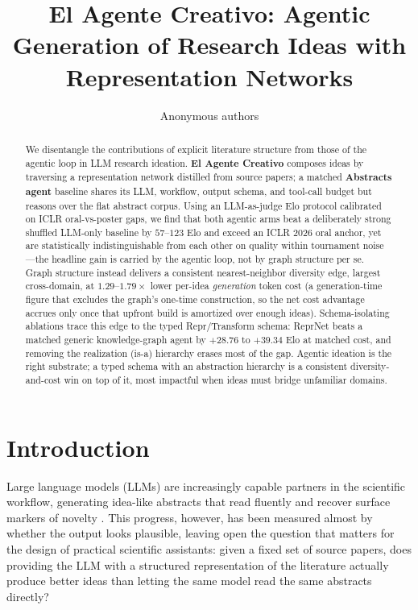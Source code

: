 \documentclass[10pt,twocolumn]{article}
\title{El Agente Creativo: Agentic Generation of Research Ideas with Representation Networks}
\author{Anonymous authors}
\begin{document}
\maketitle

\begin{abstract}
We disentangle the contributions of explicit literature structure
from those of the agentic loop in LLM research ideation.  \textbf{El
Agente Creativo} composes ideas by traversing a representation network
distilled from source papers; a matched \textbf{Abstracts agent} baseline
shares its LLM, workflow, output schema, and tool-call budget but
reasons over the flat abstract corpus.  Using an LLM-as-judge Elo
protocol calibrated on ICLR oral-vs-poster gaps, we find that both
agentic arms beat a deliberately strong shuffled LLM-only baseline by
$57$--$123$ Elo and exceed an ICLR 2026 oral anchor, yet are
statistically indistinguishable from each other on quality within
tournament noise---the headline gain is carried by the agentic loop,
not by graph structure per se.  Graph structure instead delivers a
consistent nearest-neighbor diversity edge, largest cross-domain, at
$1.29$--$1.79\times$ lower per-idea \emph{generation} token cost (a
generation-time figure that excludes the graph's one-time
construction, so the net cost advantage accrues only once that
upfront build is amortized over enough ideas).  Schema-isolating
ablations trace this edge to the typed Repr/Transform schema: ReprNet
beats a matched generic knowledge-graph agent by $+28.76$ to $+39.34$
Elo at matched cost, and removing the realization (is-a) hierarchy
erases most of the gap.  Agentic ideation is the right substrate; a
typed schema with an abstraction hierarchy is a consistent
diversity-and-cost win on top of it, most impactful when ideas must
bridge unfamiliar domains.
\end{abstract}

\section{Introduction}
Large language models (LLMs) are increasingly capable partners in the
scientific workflow, generating idea-like abstracts that read fluently and
recover surface markers of novelty
\citep{si2024llmsgeneratenovelresearch,kumar2025largelanguagemodelsunlock,lu2024aiscientistfullyautomated,vaswani2023attentionneed,brown2020languagemodelsfewshotlearners}.
This progress, however, has been measured almost by whether the
output looks plausible, leaving open the question that matters for the
design of practical scientific assistants: given a fixed set of source
papers, does providing the LLM with a structured representation of the
literature actually produce better ideas than letting the same model read
the same abstracts directly?
\end{document}
